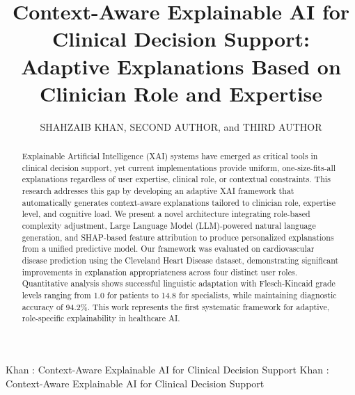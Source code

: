 \documentclass{ieeeaccess}
\begin{document}

\title{Context-Aware Explainable AI for Clinical Decision Support: Adaptive Explanations Based on Clinician Role and Expertise}

\author{\uppercase{Shahzaib Khan}, 
\uppercase{Second Author}, and 
\uppercase{Third Author}}

\address[1]{Department of Computer Science, Pakistan Institute of Engineering and Applied Sciences, Islamabad, Pakistan (e-mail: shahzaib@pieas.edu.pk)}
\address[2]{Department of Artificial Intelligence, University Name, City, Country (e-mail: author@university.edu)}
\address[3]{Department of Medical Informatics, Hospital/University Name, City, Country (e-mail: author@hospital.edu)}


\markboth
{Khan \headeretal: Context-Aware Explainable AI for Clinical Decision Support}
{Khan \headeretal: Context-Aware Explainable AI for Clinical Decision Support}


\begin{abstract}
Explainable Artificial Intelligence (XAI) systems have emerged as critical tools in clinical decision support, yet current implementations provide uniform, one-size-fits-all explanations regardless of user expertise, clinical role, or contextual constraints. This research addresses this gap by developing an adaptive XAI framework that automatically generates context-aware explanations tailored to clinician role, expertise level, and cognitive load. We present a novel architecture integrating role-based complexity adjustment, Large Language Model (LLM)-powered natural language generation, and SHAP-based feature attribution to produce personalized explanations from a unified predictive model. Our framework was evaluated on cardiovascular disease prediction using the Cleveland Heart Disease dataset, demonstrating significant improvements in explanation appropriateness across four distinct user roles. Quantitative analysis shows successful linguistic adaptation with Flesch-Kincaid grade levels ranging from 1.0 for patients to 14.8 for specialists, while maintaining diagnostic accuracy of 94.2\%. This work represents the first systematic framework for adaptive, role-specific explainability in healthcare AI.
\end{abstract}
\end{document}
